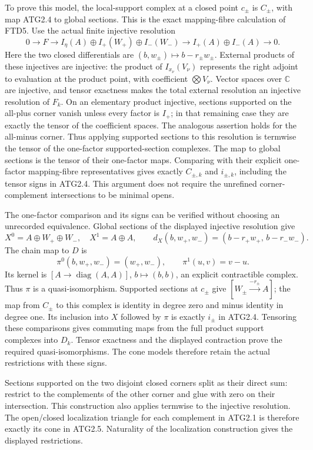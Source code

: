To prove this model, the local-support complex at a closed point
\(c_\pm\) is \(C_\pm\), with map ATG2.4 to global sections. This is the
exact mapping-fibre calculation of FTD5. Use the actual finite injective
resolution \[
0\to F\to I_\eta(A)\oplus I_+(W_+)\oplus I_-(W_-)
\to I_+(A)\oplus I_-(A)\to0.
\] Here the two closed differentials are
\((b,w_\pm)\mapsto b-r_\pm w_\pm\). External products of these
injectives are injective: the product of \(I_{x_\nu}(V_\nu)\) represents
the right adjoint to evaluation at the product point, with coefficient
\(\bigotimes V_\nu\). Vector spaces over \(\mathbb C\) are injective,
and tensor exactness makes the total external resolution an injective
resolution of \(F_k\). On an elementary product injective, sections
supported on the all-plus corner vanish unless every factor is \(I_+\);
in that remaining case they are exactly the tensor of the coefficient
spaces. The analogous assertion holds for the all-minus corner. Thus
applying supported sections to this resolution is termwise the tensor of
the one-factor supported-section complexes. The map to global sections
is the tensor of their one-factor maps. Comparing with their explicit
one-factor mapping-fibre representatives gives exactly \(C_{\pm,k}\) and
\(i_{\pm,k}\), including the tensor signs in ATG2.4. This argument does
not require the unrefined corner-complement intersections to be minimal
opens.

The one-factor comparison and its signs can be verified without choosing
an unrecorded equivalence. Global sections of the displayed injective
resolution give \[
X^0=A\oplus W_+\oplus W_-,\quad X^1=A\oplus A,\qquad
d_X(b,w_+,w_-)=(b-r_+w_+,\,b-r_-w_-).
\] The chain map to \(D\) is \[
\pi^0(b,w_+,w_-)=(w_+,w_-),\qquad \pi^1(u,v)=v-u.
\] Its kernel is \([A\to\operatorname{diag}(A,A)]\), \(b\mapsto(b,b)\),
an explicit contractible complex. Thus \(\pi\) is a quasi-isomorphism.
Supported sections at \(c_\pm\) give \([W_\pm\xrightarrow{-r_\pm}A]\);
the map from \(C_\pm\) to this complex is identity in degree zero and
minus identity in degree one. Its inclusion into \(X\) followed by
\(\pi\) is exactly \(i_\pm\) in ATG2.4. Tensoring these comparisons
gives commuting maps from the full product support complexes into
\(D_k\). Tensor exactness and the displayed contraction prove the
required quasi-isomorphisms. The cone models therefore retain the actual
restrictions with these signs.

Sections supported on the two disjoint closed corners split as their
direct sum: restrict to the complements of the other corner and glue
with zero on their intersection. This construction also applies termwise
to the injective resolution. The open/closed localization triangle for
each complement in ATG2.1 is therefore exactly its cone in ATG2.5.
Naturality of the localization construction gives the displayed
restrictions.

